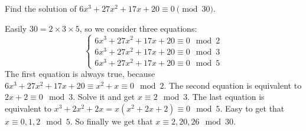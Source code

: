 \documentclass{ctexart}
\newif\ifpreface
\begin{document}
\large
\setlength{\baselineskip}{1.2em}
\ifpreface

\else
{}
\begin{problem}\label{pro:1}
  Find the solution of \(6x^3 + 27 x^2 + 17x + 20 \equiv 0 \pmod{ 30}\).
\end{problem}
\begin{solution}
  Easily \(30=2\times3\times5\), so we consider three equations:
  \[
    \begin{cases}
      6x^3 + 27 x^2 + 17x + 20 \equiv 0 \mod 2 \\
      6x^3 + 27 x^2 + 17x + 20 \equiv 0 \mod 3 \\
      6x^3 + 27 x^2 + 17x + 20 \equiv 0 \mod 5
    \end{cases}
  \]
  The first equation is always true, because \(6x^3 + 27 x^2 + 17x + 20 \equiv x^2+x \equiv 0 \mod 2\).
  The second equation is equivalent to \(2x+2 \equiv 0 \mod 3\). Solve it and get \(x \equiv 2 \mod 3\).
  The last equation is equivalent to \(x^3+2x^2+2x =x(x^2+2x+2)\equiv 0 \mod 5\).
  Easy to get that \(x \equiv 0,1,2 \mod 5\).
  So finally we get that \(x \equiv 2,20,26 \mod 30\).
\end{solution}
\end{document}
